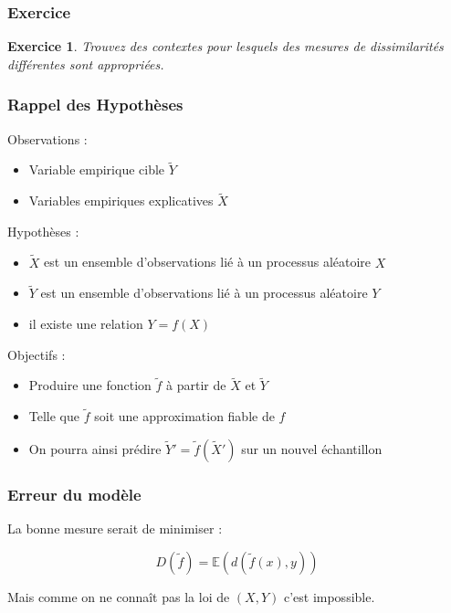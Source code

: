 \documentclass[11pt]{beamer}
\newenvironment{slide}[1]{%
\begin{frame}[environment=slide]
\frametitle{#1}
}{%
\end{frame}
}
\newtheorem{exercice}{Exercice}
\begin{document}
\begin{slide}{Exercice}

\begin{exercice}
Trouvez des contextes pour lesquels des mesures de dissimilarités différentes sont appropriées.
\end{exercice}

\end{slide}


\begin{slide}{Rappel des Hypothèses}
Observations :\\

\begin{itemize}

\item Variable empirique cible $\tilde{Y}$
\item Variables empiriques explicatives $\tilde{X}$

\end{itemize}

\pause

Hypothèses :\\

\begin{itemize}

\item $\tilde{X}$ est un ensemble d'observations lié à un processus aléatoire $X$
\item $\tilde{Y}$ est un ensemble d'observations lié à un processus aléatoire $Y$
\item il existe une relation $Y = f(X)$

\end{itemize}

\pause

Objectifs :\\

\begin{itemize}
\item Produire une fonction $\tilde{f}$ à partir de $\tilde{X}$ et $\tilde{Y}$
\item Telle que $\tilde{f}$ soit une approximation fiable de $f$
\item On pourra ainsi prédire $\tilde{Y}' = \tilde{f}(\tilde{X}')$ sur un nouvel échantillon 
\end{itemize}

\end{slide}


\begin{slide}{Erreur du modèle}

La bonne mesure serait de minimiser :

$$D(\tilde{f}) = \mathbb{E}(d(\tilde{f}(x),y))$$

\pause

Mais comme on ne connaît pas la loi de $(X,Y)$ c'est impossible.

\end{slide}
\end{document}

